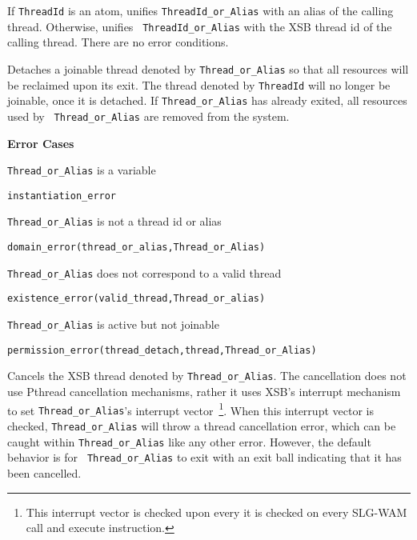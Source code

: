 \begin{description}
%
If {\tt ThreadId} is an atom, unifies {\tt ThreadId\_or\_Alias} with
an alias of the calling thread.  Otherwise, unifies {\tt
  ThreadId\_or\_Alias} with the XSB thread id of the calling thread.
There are no error conditions.


%
Detaches a joinable thread denoted by {\tt Thread\_or\_Alias} so that
all resources will be reclaimed upon its exit.  The thread denoted by
{\tt ThreadId} will no longer be joinable, once it is detached.  If
{\tt Thread\_or\_Alias} has already exited, all resources used by {\tt
  Thread\_or\_Alias} are removed from the system.


{\bf Error Cases}
\bi
%
\item 	{\tt Thread\_or\_Alias} is a variable
\bi
\item 	{\tt instantiation\_error}
\ei
%
\item 	{\tt Thread\_or\_Alias} is not a thread id or alias
\bi
\item 	{\tt domain\_error(thread\_or\_alias,Thread\_or\_Alias)}
\ei
%
\item   {\tt Thread\_or\_Alias} does not correspond to a valid thread
\bi
\item   {\tt existence\_error(valid\_thread,Thread\_or\_alias)}
\ei
%
\item 	{\tt Thread\_or\_Alias} is active but not joinable
\bi
\item 	{\tt permission\_error(thread\_detach,thread,Thread\_or\_Alias)}
\ei
\ei

%
Cancels the XSB thread denoted by {\tt Thread\_or\_Alias}.  The cancellation
does not use Pthread cancellation mechanisms, rather it uses XSB's
interrupt mechanism to set {\tt Thread\_or\_Alias}'s interrupt
vector~\footnote{This interrupt vector is checked upon every it is
  checked on every SLG-WAM {\sf call} and {\sf execute} instruction.}.
When this interrupt vector is checked, {\tt Thread\_or\_Alias} will throw a
thread cancellation error, which can be caught within {\tt Thread\_or\_Alias}
like any other error.  However, the default behavior is for {\tt
  Thread\_or\_Alias} to exit with an exit ball indicating that it has been
cancelled.  


\end{description}
